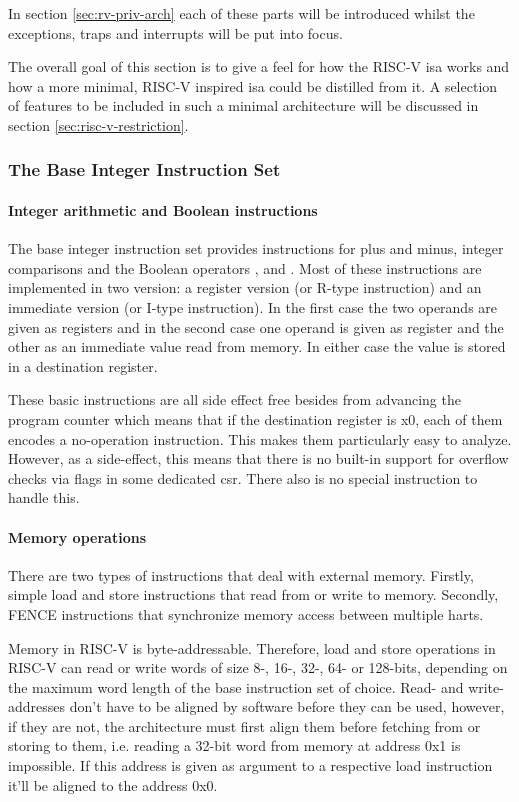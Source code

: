 In section \ref{sec:rv-priv-arch} each of these parts will be introduced whilst the exceptions, traps and interrupts will be put into focus.

The overall goal of this section is to give a feel for how the RISC-V \gls{isa} works and how a more minimal, RISC-V inspired \gls{isa} could be distilled from it.
A selection of features to be included in such a minimal architecture will be discussed in section \ref{sec:risc-v-restriction}.

\subsubsection{The Base Integer Instruction Set}
\label{sec:rv-base-int-isa}

\paragraph{Integer arithmetic and Boolean instructions}
The base integer instruction set provides instructions for plus and minus, integer comparisons and the Boolean operators ,  and .
Most of these instructions are implemented in two version: a register version (or R-type instruction) and an immediate version (or I-type instruction).
In the first case the two operands are given as registers and in the second case one operand is given as register and the other as an immediate value read from memory.
In either case the value is stored in a destination register.

These basic instructions are all side effect free besides from advancing the program counter which means that if the destination register is x0, each of them encodes a no-operation instruction.
This makes them particularly easy to analyze.
However, as a side-effect, this means that there is no built-in support for overflow checks via flags in some dedicated \gls{csr}.
There also is no special instruction to handle this.

\paragraph{Memory operations}
There are two types of instructions that deal with external memory.
Firstly, simple load and store instructions that read from or write to memory.
Secondly, FENCE instructions that synchronize memory access between multiple \glspl{hart}.

Memory in RISC-V is byte-addressable.
Therefore, load and store operations in RISC-V can read or write words of size 8-, 16-, 32-, 64- or 128-bits, depending on the maximum word length of the base instruction set of choice.
Read- and write-addresses don't have to be aligned by software before they can be used, however, if they are not, the architecture must first align them before fetching from or storing to them, i.e. reading a 32-bit word from memory at address 0x1 is impossible.
If this address is given as argument to a respective load instruction it'll be aligned to the address 0x0.

